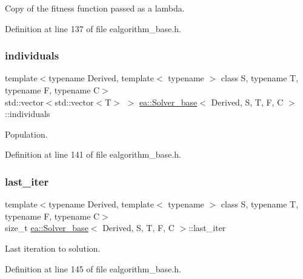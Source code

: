 Copy of the fitness function passed as a lambda. 



Definition at line 137 of file ealgorithm\+\_\+base.\+h.

\mbox{\label{classea_1_1_solver__base_ad75bc440d24a46e97694c7c889f2ecde}} 
\subsubsection{\texorpdfstring{individuals}{individuals}}
{\footnotesize\ttfamily template$<$typename Derived, template$<$ typename $>$ class S, typename T, typename F, typename C$>$ \\
std\+::vector$<$std\+::vector$<$T$>$ $>$ \hyperlink{classea_1_1_solver__base}{ea\+::\+Solver\+\_\+base}$<$ Derived, S, T, F, C $>$\+::individuals\hspace{0.3cm}{\ttfamily [protected]}}



Population. 



Definition at line 141 of file ealgorithm\+\_\+base.\+h.

\mbox{\label{classea_1_1_solver__base_a8f9a321eb87e57636cf0b0f3a57b6fc2}} 
\subsubsection{\texorpdfstring{last\+\_\+iter}{last\_iter}}
{\footnotesize\ttfamily template$<$typename Derived, template$<$ typename $>$ class S, typename T, typename F, typename C$>$ \\
size\+\_\+t \hyperlink{classea_1_1_solver__base}{ea\+::\+Solver\+\_\+base}$<$ Derived, S, T, F, C $>$\+::last\+\_\+iter\hspace{0.3cm}{\ttfamily [protected]}}



Last iteration to solution. 



Definition at line 145 of file ealgorithm\+\_\+base.\+h.

